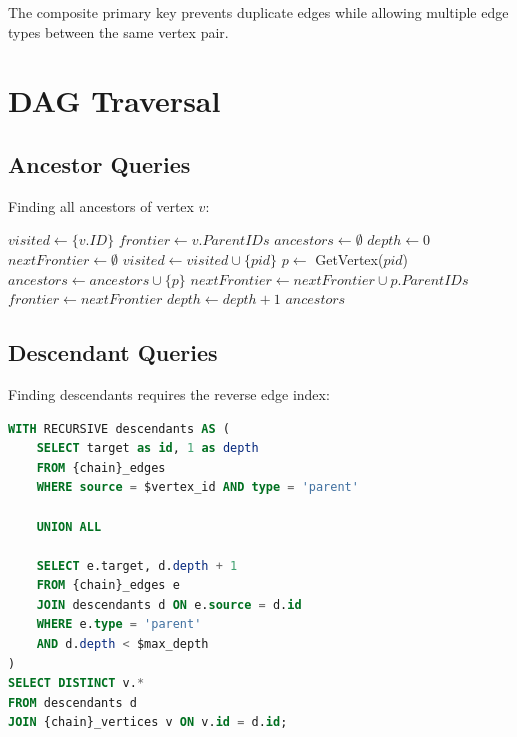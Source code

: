 \documentclass[11pt,twocolumn]{article}
\begin{document}
The composite primary key prevents duplicate edges while allowing multiple edge types between the same vertex pair.

\section{DAG Traversal}

\subsection{Ancestor Queries}

Finding all ancestors of vertex $v$:

\begin{algorithm}
\caption{Ancestor Traversal}
\begin{algorithmic}[1]
    \State $visited \gets \{v.ID\}$
    \State $frontier \gets v.ParentIDs$
    \State $ancestors \gets \emptyset$
    \State $depth \gets 0$
        \State $nextFrontier \gets \emptyset$
                \State $visited \gets visited \cup \{pid\}$
                \State $p \gets$ GetVertex($pid$)
                \State $ancestors \gets ancestors \cup \{p\}$
                \State $nextFrontier \gets nextFrontier \cup p.ParentIDs$
            \EndIf
        \EndFor
        \State $frontier \gets nextFrontier$
        \State $depth \gets depth + 1$
    \EndWhile
    \State \Return $ancestors$
\EndProcedure
\end{algorithmic}
\end{algorithm}

\subsection{Descendant Queries}

Finding descendants requires the reverse edge index:

\begin{lstlisting}[language=SQL,caption={Descendant query}]
WITH RECURSIVE descendants AS (
    SELECT target as id, 1 as depth
    FROM {chain}_edges
    WHERE source = $vertex_id AND type = 'parent'

    UNION ALL

    SELECT e.target, d.depth + 1
    FROM {chain}_edges e
    JOIN descendants d ON e.source = d.id
    WHERE e.type = 'parent'
    AND d.depth < $max_depth
)
SELECT DISTINCT v.*
FROM descendants d
JOIN {chain}_vertices v ON v.id = d.id;
\end{lstlisting}
\end{document}
